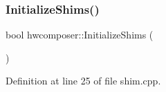 \mbox{\label{namespacehwcomposer_a1e2712274f1d2ee3a6b1662cca909699}} 
\subsubsection{\texorpdfstring{Initialize\+Shims()}{InitializeShims()}}
{\footnotesize\ttfamily bool hwcomposer\+::\+Initialize\+Shims (\begin{DoxyParamCaption}{ }\end{DoxyParamCaption})}



Definition at line 25 of file shim.\+cpp.


